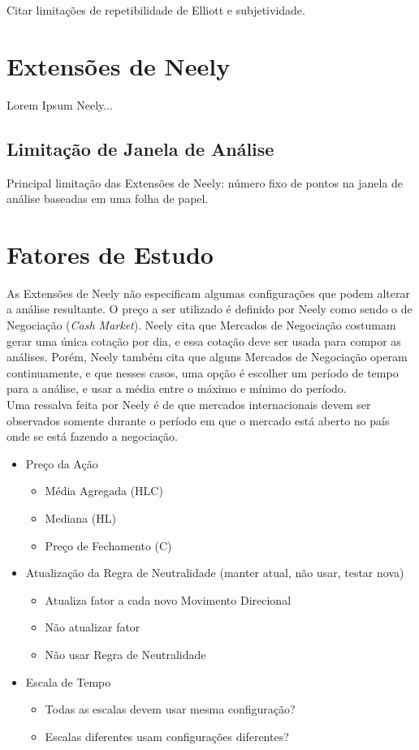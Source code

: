 \documentclass[12pt]{article}
\begin{document}
Citar limitações de repetibilidade de Elliott e subjetividade.

\section{Extensões de Neely} \label{sec:Neely-Extensions}

Lorem Ipsum Neely...

\subsection{Limitação de Janela de Análise}

Principal limitação das Extensões de Neely: número fixo de pontos na janela de análise
baseadas em uma folha de papel.

\section{Fatores de Estudo}

As Extensões de Neely não especificam algumas configurações que podem alterar a
análise resultante. O preço a ser utilizado é definido por Neely como sendo o de Negociação
(\textit{Cash Market}). Neely cita que Mercados de Negociação costumam gerar uma única cotação
por dia, e essa cotação deve ser usada para compor as análises. Porém, Neely também cita
que alguns Mercados de Negociação operam continuamente, e que nesses casos, uma opção é
escolher um período de tempo para a análise, e usar a média entre o máximo e mínimo do período.\\

Uma ressalva feita por Neely é de que mercados internacionais devem ser observados somente
durante o período em que o mercado está aberto no país onde se está fazendo a negociação.

\begin{itemize}
	\item Preço da Ação
	\begin{itemize}
		\item Média Agregada (HLC)
		\item Mediana (HL)
		\item Preço de Fechamento (C)
	\end{itemize}
	\item Atualização da Regra de Neutralidade (manter atual, não usar, testar nova)
	\begin{itemize}
		\item Atualiza fator a cada novo Movimento Direcional
		\item Não atualizar fator
		\item Não usar Regra de Neutralidade
	\end{itemize}
	\item Escala de Tempo
	\begin{itemize}
		\item Todas as escalas devem usar mesma configuração?
		\item Escalas diferentes usam configurações diferentes?
	\end{itemize}
\end{itemize}
\end{document}
